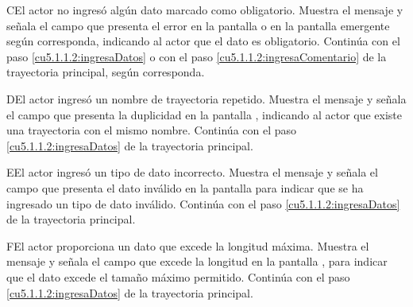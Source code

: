  \begin{UCtrayectoriaA}{C}{El actor no ingresó algún dato marcado como obligatorio.}
    \UCpaso[\UCsist] Muestra el mensaje  y señala el campo que presenta el error en la pantalla 
	     o en la pantalla emergente  según corresponda, indicando al actor que el dato es obligatorio.
    \UCpaso[] Continúa con el paso \ref{cu5.1.1.2:ingresaDatos} o con el paso \ref{cu5.1.1.2:ingresaComentario} de la trayectoria principal, según corresponda.
 \end{UCtrayectoriaA}
 \begin{UCtrayectoriaA}{D}{El actor ingresó un nombre de trayectoria repetido.}
    \UCpaso[\UCsist] Muestra el mensaje  y señala el campo que presenta la duplicidad en la pantalla 
	    , indicando al actor que existe una trayectoria con el mismo nombre.
    \UCpaso[] Continúa con el paso \ref{cu5.1.1.2:ingresaDatos} de la trayectoria principal.
 \end{UCtrayectoriaA}
 \begin{UCtrayectoriaA}{E}{El actor ingresó un tipo de dato incorrecto.}
    \UCpaso[\UCsist] Muestra el mensaje  y señala el campo que presenta el dato inválido en la 
    pantalla  para indicar que se ha ingresado un tipo de dato inválido.
    \UCpaso[] Continúa con el paso \ref{cu5.1.1.2:ingresaDatos} de la trayectoria principal.
 \end{UCtrayectoriaA}
 \begin{UCtrayectoriaA}{F}{El actor proporciona un dato que excede la longitud máxima.}
    \UCpaso[\UCsist] Muestra el mensaje  y señala el campo que excede la 
    longitud en la pantalla , para indicar que el dato excede el tamaño máximo permitido.
    \UCpaso[] Continúa con el paso \ref{cu5.1.1.2:ingresaDatos} de la trayectoria principal.
 \end{UCtrayectoriaA}
 
